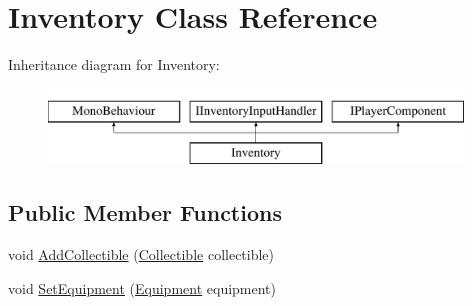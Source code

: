 \hypertarget{class_inventory}{}\section{Inventory Class Reference}
\label{class_inventory}
Inheritance diagram for Inventory\+:\begin{figure}[H]
\begin{center}
\leavevmode
\includegraphics[height=2.000000cm]{class_inventory}
\end{center}
\end{figure}
\subsection*{Public Member Functions}
\begin{DoxyCompactItemize}
\item 
void \mbox{\hyperlink{class_inventory_aa38bdf60c64fba830e494a30c9740383}{Add\+Collectible}} (\mbox{\hyperlink{class_collectible}{Collectible}} collectible)
\item 
void \mbox{\hyperlink{class_inventory_acdcf6c26c9b9be07d53c2f72cc868dc4}{Set\+Equipment}} (\mbox{\hyperlink{class_equipment}{Equipment}} equipment)
\end{DoxyCompactItemize}
